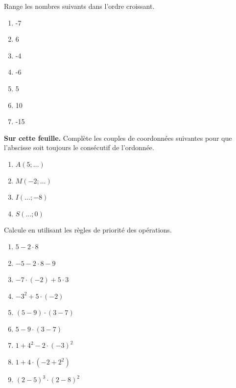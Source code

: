 \documentclass[12pt,parskip=half-, twoside=semi]{scrartcl}
\begin{document}
\begin{exercise}
    Range les nombres suivants dans l'ordre croissant. 
    \begin{enumerate}[cols = 7, label=]
        \item -7
        \item 6
        \item -4
        \item -6
        \item 5
        \item 10
        \item -15
    \end{enumerate}
\end{exercise}

\newpage
\begin{exercise}
    \textbf{Sur cette feuille.} Complète les couples de coordonnées suivantes pour que l'abscisse soit toujours le consécutif de l'ordonnée. 
    \begin{enumerate}[cols=4, label=]
        \item $A\left(5; \ldots\right)$
        \item $M\left(-2; \ldots \right)$
        \item $I\left(\ldots ; -8\right)$
        \item $S\left(\ldots ; 0\right)$
    \end{enumerate}
\end{exercise}

\begin{exercise}
    Calcule en utilisant les règles de priorité des opérations.
    \begin{enumerate}[cols=3]
        \item $	5 - 2 \cdot 8$
        \item $-5 - 2 \cdot 8 - 9$
        \item $-7 \cdot(-2)+ 5 \cdot 3$
        \item $-3^2 + 5 \cdot (-2)$
        \item $(5 - 9 )\cdot(3 - 7)$
        \item $5 - 9 \cdot(3 - 7)$
        \item $ 1 + 4^2- 2 \cdot (-3)^2$
        \item $ 1+ 4 \cdot ( -2 + 2^2 )$
        \item $(2 - 5 )^3 \cdot (2 - 8 )^2$
    \end{enumerate}
\end{exercise}
\end{document}

